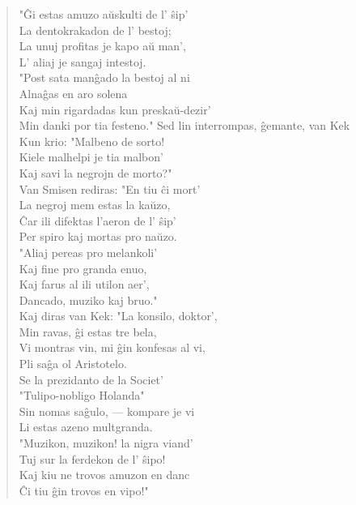 \begin{verse}
                 \vin   "\^Gi estas amuzo a\u uskulti de l' \^sip'\\
                 La dentokrakadon de l' bestoj;\\
                 La unuj profitas je kapo a\u u man',\\
                 L' aliaj je sangaj intestoj.\\
                 \vin   "Post sata man\^gado la bestoj al ni\\
                 Alna\^gas en aro solena\\
                 Kaj min rigardadas kun preska\u u-dezir'\\
                 Min danki por tia festeno."
                 \vin   Sed lin interrompas, \^gemante, van Kek\\
                 Kun krio: "Malbeno de sorto!\\
                 Kiele malhelpi je tia malbon'\\
                 Kaj savi la negrojn de morto?"\\
                  \vin  Van Smisen rediras: "En tiu \^ci mort'\\
                 La negroj mem estas la ka\u uzo,\\
                 \^Car ili difektas l'aeron de l' \^sip'\\
                 Per spiro kaj mortas pro na\u uzo.\\
                  \vin  "Aliaj pereas pro melankoli'\\
                 Kaj fine pro granda enuo,\\
                 Kaj farus al ili utilon aer',\\
                 Dancado, muziko kaj bruo."\\
                  \vin  Kaj diras van Kek: "La konsilo, doktor',\\
                 Min ravas, \^gi estas tre bela,\\
                 Vi montras vin, mi \^gin konfesas al vi,\\
                 Pli sa\^ga ol Aristotelo.\\
                 \vin   Se la prezidanto de la Societ'\\
                 "Tulipo-nobligo Holanda"\\
                 Sin nomas sa\^gulo, --- kompare je vi\\
                 Li estas azeno multgranda.\\
                  \vin  "Muzikon, muzikon! la nigra viand'\\
                 Tuj sur la ferdekon de l' \^sipo!\\
                 Kaj kiu ne trovos amuzon en danc\\
                 \^Ci tiu \^gin trovos en vipo!"


\end{verse}
